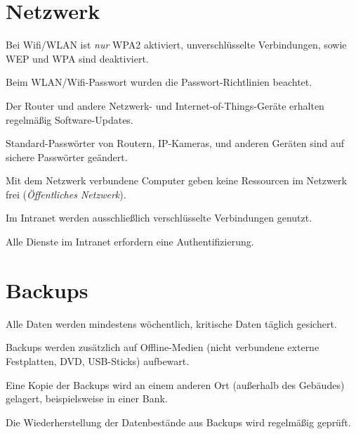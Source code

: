 \documentclass[10pt,a4paper]{article}
\begin{document}
\section{Netzwerk}
\begin{todolist}
\item{Bei Wifi/WLAN ist \textit{nur} WPA2 aktiviert, unverschlüsselte Verbindungen, sowie WEP und WPA sind deaktiviert.}
\item{Beim WLAN/Wifi-Passwort wurden die Passwort-Richtlinien beachtet.}
\item{Der Router und andere Netzwerk- und Internet-of-Things-Geräte erhalten regelmäßig Software-Updates.}
\item{Standard-Passwörter von Routern, IP-Kameras, und anderen Geräten sind auf sichere Passwörter geändert.}
\item{Mit dem Netzwerk verbundene Computer geben keine Ressourcen im Netzwerk frei (\textit{Öffentliches Netzwerk}).}
\item{Im Intranet werden ausschließlich verschlüsselte Verbindungen genutzt.}
\item{Alle Dienste im Intranet erfordern eine Authentifizierung.}
\end{todolist}

\section{Backups}
\begin{todolist}
\item{Alle Daten werden mindestens wöchentlich, kritische Daten täglich gesichert.}
\item{Backups werden zusätzlich auf Offline-Medien (nicht verbundene externe Festplatten, DVD, USB-Sticks) aufbewart.}
\item{Eine Kopie der Backups wird an einem anderen Ort (außerhalb des Gebäudes) gelagert, beispielsweise in einer Bank.}
\item{Die Wiederherstellung der Datenbestände aus Backups wird regelmäßig geprüft.}
\end{todolist}
\end{document}
